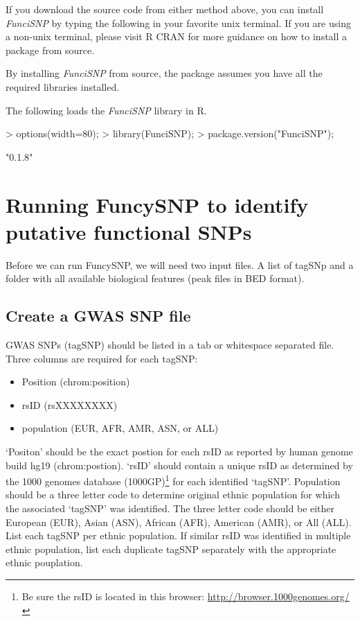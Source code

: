 \documentclass[12pt,fullpage]{article}
\newcommand{\Rpackage}[1]{{\textit{#1}}}
\begin{document}
If you download the source code from either method above, you can install
\Rpackage{FunciSNP} by typing the following in your favorite unix terminal. If
you are using a non-unix terminal, please visit R CRAN for more guidance on how
to install a package from source.

By installing \Rpackage{FunciSNP} from source, the package assumes you have all
the required libraries installed.

The following loads the \Rpackage{FunciSNP} library in R.

\begin{Schunk}
\begin{Sinput}
> options(width=80);
> library(FunciSNP);
> package.version("FunciSNP");
\end{Sinput}
\begin{Soutput}
[1] "0.1.8"
\end{Soutput}
\end{Schunk}

\section{Running FuncySNP to identify putative functional SNPs}

Before we can run FuncySNP, we will need two input files. A list of tagSNp and a
folder with all available biological features (peak files in BED format).

\subsection{Create a GWAS SNP file}

GWAS SNPs (tagSNP) should be listed in a tab or whitespace separated file. Three
columns are required for each tagSNP: 

\begin{itemize}
\item Position (chrom:position)
\item rsID (rsXXXXXXXX)
\item population (EUR, AFR, AMR, ASN, or ALL)
\end{itemize}

`Positon' should be the exact postion for each rsID as reported by human genome
build hg19 (chrom:postion). `rsID' should contain a unique rsID as determined by
the 1000 genomes database (1000GP)\footnote{Be sure the rsID is located in this
browser: \url{http://browser.1000genomes.org/}} for each identified `tagSNP'.
Population should be a three letter code to determine original ethnic population
for which the associated `tagSNP' was identified. The three letter code should
be either European (EUR), Asian (ASN), African (AFR), American (AMR), or All
(ALL). List each tagSNP per ethnic population. If similar rsID was identified in
multiple ethnic population, list each duplicate tagSNP separately with the
appropriate ethnic pouplation.
\end{document}
